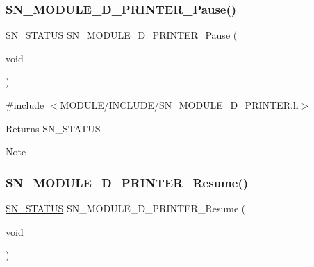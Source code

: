 \subsubsection{\texorpdfstring{S\+N\+\_\+\+M\+O\+D\+U\+L\+E\+\_\+D\+\_\+\+P\+R\+I\+N\+T\+E\+R\+\_\+\+Pause()}{SN\_MODULE\_3D\_PRINTER\_Pause()}}
{\footnotesize\ttfamily \hyperlink{group__SYSTEM__ERROR_ga4540713b9a7a18ce44d78c3a10f7442f}{S\+N\+\_\+\+S\+T\+A\+T\+US} S\+N\+\_\+\+M\+O\+D\+U\+L\+E\+\_\+D\+\_\+\+P\+R\+I\+N\+T\+E\+R\+\_\+\+Pause (\begin{DoxyParamCaption}\item[{void}]{ }\end{DoxyParamCaption})}



{\ttfamily \#include $<$\hyperlink{SN__MODULE__3D__PRINTER_8h}{M\+O\+D\+U\+L\+E/\+I\+N\+C\+L\+U\+D\+E/\+S\+N\+\_\+\+M\+O\+D\+U\+L\+E\+\_\+D\+\_\+\+P\+R\+I\+N\+T\+E\+R.\+h}$>$}

\begin{DoxyReturn}{Returns}
S\+N\+\_\+\+S\+T\+A\+T\+US
\end{DoxyReturn}
\begin{DoxyNote}{Note}

\end{DoxyNote}
\mbox{\label{group__MODULE__3D__PRINTER_gaabec8b5f01119d989d725eff26053ca5}} 
\subsubsection{\texorpdfstring{S\+N\+\_\+\+M\+O\+D\+U\+L\+E\+\_\+D\+\_\+\+P\+R\+I\+N\+T\+E\+R\+\_\+\+Resume()}{SN\_MODULE\_3D\_PRINTER\_Resume()}}
{\footnotesize\ttfamily \hyperlink{group__SYSTEM__ERROR_ga4540713b9a7a18ce44d78c3a10f7442f}{S\+N\+\_\+\+S\+T\+A\+T\+US} S\+N\+\_\+\+M\+O\+D\+U\+L\+E\+\_\+D\+\_\+\+P\+R\+I\+N\+T\+E\+R\+\_\+\+Resume (\begin{DoxyParamCaption}\item[{void}]{ }\end{DoxyParamCaption})}



